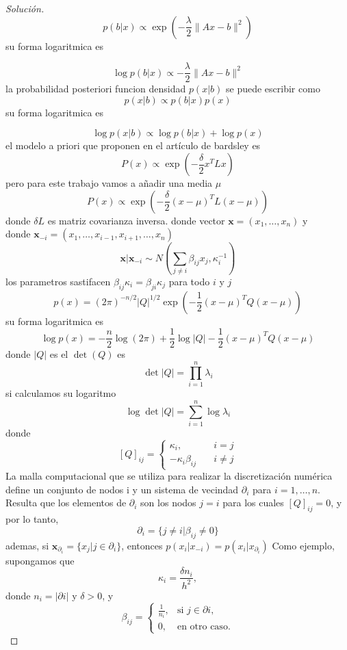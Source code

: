 \documentclass[12pt,spanish,mexico]{article}
\numberwithin{equation}{section}
\theoremstyle{definition}
\theoremstyle{remark}
\newenvironment{solution}{\begin{proof}[Solución]}{\end{proof}}
\begin{document}
\begin{enumerate}
\begin{solution}
  \[
  p(b|x) \propto \exp \left(-\frac{\lambda}{2}\|Ax-b\|^2\right)
  \]
  su forma logaritmica es 

  \[
  \log p(b|x) \propto  -\frac{\lambda}{2}\|Ax-b\|^2
  \]
  la probabilidad posteriori funcion densidad $p(x|b)$ se puede escribir como
  \[
  p(x|b) \propto p(b|x)p(x)
  \]
  su forma logaritmica es 

  \[
  \log p(x|b) \propto  \log p(b|x)+ \log p(x)
  \]
  el modelo a priori que proponen en el artículo de bardsley es
  \[
  P(x) \propto \exp\left(-\frac{\delta}{2}x^T L x\right)
  \]
  pero para este trabajo vamos a añadir una media $\mu$
  \[
  P(x) \propto \exp\left(-\frac{\delta}{2}(x-\mu)^T L (x-\mu)\right)
  \]
  donde $\delta L$ es matriz covarianza inversa. donde vector $\textbf{x}=(x_1,\dots, x_n)$ y \\
  donde $\textbf{x}_{-i}=(x_1,\dots,x_{i-1},x_{i+1},\dots,x_n)$
  \[
   \textbf{x}|\textbf{x}_{-i} \sim N \left(\sum_{j \neq i}\beta_{ij}x_j, \kappa_i^{-1} \right)
  \]
  los parametros sastifacen $\beta_{ij} \kappa_i=\beta_{ji} \kappa_j$ para todo $i$ y $j$
  \[
  p(x)=(2 \pi)^{-n/2}|Q|^{1/2}\exp \left(-\frac{1}{2}(x-\mu)^T Q (x-\mu)\right)
  \]
  su forma logaritmica es
  \[
  \log p(x)=-\frac{n}{2} \log(2 \pi)+ \frac{1}{2}\log|Q| -\frac{1}{2}(x-\mu)^T Q (x-\mu)
  \]
  donde $|Q|$ es el $\det(Q)$ es
  \[
  \det|Q|=\prod_{i=1}^{n} \lambda_i
  \]
  si calculamos su logaritmo
  \[
  \log \det|Q|=\sum_{i=1}^{n} \log \lambda_i
  \]
  donde 
  \[
  \left[Q \right]_{ij}=\begin{cases}
    \kappa_i,  \quad & i=j \\
    -\kappa_i \beta_{ij} \quad & i \neq j
  \end{cases}
  \]
  La malla computacional que se utiliza para realizar la discretización numérica define un conjunto de nodos i y un 
  sistema de vecindad  $\partial_i$ para $i = 1,\dots,n$. Resulta que los elementos de $\partial_i$ son los nodos $j = i$ para los cuales $\left[Q\right]_{ij} = 0$, 
  y por lo tanto,
  \[
  \partial_i  =\{j \neq i| \beta_{ij} \neq 0\}
  \]
  ademas, si $\textbf{x}_{\partial_i}=\{x_j | j \in \partial_i \}$, entonces $p\left(x_i|x_{-i}\right)=p\left(x_i|x_{\partial_i}\right)$
  Como ejemplo, supongamos que
\[
\kappa_i = \frac{\delta n_i}{h^2},
\]
donde \( n_i = |\partial i| \) y \( \delta > 0 \), y
\[
\beta_{ij} =
\begin{cases}
\frac{1}{n_i}, & \text{si } j \in \partial i, \\
0, & \text{en otro caso}.
\end{cases}
\]


\end{solution}
\end{enumerate}
\end{document}
